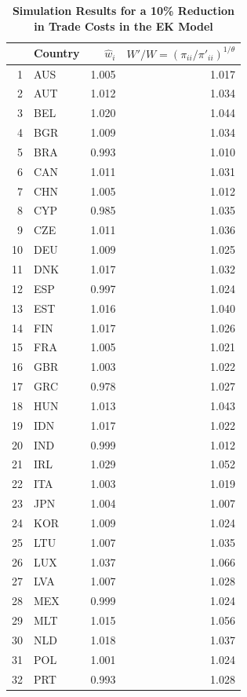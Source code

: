 \documentclass[12pt]{article}
\begin{document}
\begin{table}[!htpb]
\centering
\caption{\textbf{Simulation Results for a 10\% Reduction in Trade Costs in the EK Model}}
\begin{tabular}{rlrr}
  \hline
 & Country & $\hat w_i$ & $W'/W=(\pi_{ii}/\pi'_{ii})^{1/\theta}$\\ 
  \hline
1 & AUS & 1.005 & 1.017 \\ 
  2 & AUT & 1.012 & 1.034 \\ 
  3 & BEL & 1.020 & 1.044 \\ 
  4 & BGR & 1.009 & 1.034 \\ 
  5 & BRA & 0.993 & 1.010 \\ 
  6 & CAN & 1.011 & 1.031 \\ 
  7 & CHN & 1.005 & 1.012 \\ 
  8 & CYP & 0.985 & 1.035 \\ 
  9 & CZE & 1.011 & 1.036 \\ 
  10 & DEU & 1.009 & 1.025 \\ 
  11 & DNK & 1.017 & 1.032 \\ 
  12 & ESP & 0.997 & 1.024 \\ 
  13 & EST & 1.016 & 1.040 \\ 
  14 & FIN & 1.017 & 1.026 \\ 
  15 & FRA & 1.005 & 1.021 \\ 
  16 & GBR & 1.003 & 1.022 \\ 
  17 & GRC & 0.978 & 1.027 \\ 
  18 & HUN & 1.013 & 1.043 \\ 
  19 & IDN & 1.017 & 1.022 \\ 
  20 & IND & 0.999 & 1.012 \\ 
  21 & IRL & 1.029 & 1.052 \\ 
  22 & ITA & 1.003 & 1.019 \\ 
  23 & JPN & 1.004 & 1.007 \\ 
  24 & KOR & 1.009 & 1.024 \\ 
  25 & LTU & 1.007 & 1.035 \\ 
  26 & LUX & 1.037 & 1.066 \\ 
  27 & LVA & 1.007 & 1.028 \\ 
  28 & MEX & 0.999 & 1.024 \\ 
  29 & MLT & 1.015 & 1.056 \\ 
  30 & NLD & 1.018 & 1.037 \\ 
  31 & POL & 1.001 & 1.024 \\ 
  32 & PRT & 0.993 & 1.028 \\ 

\end{tabular}
\end{table}
\end{document}
